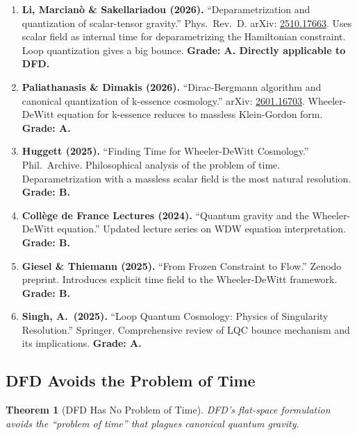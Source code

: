 \documentclass[11pt,a4paper]{article}
\newtheorem{theorem}{Theorem}
\begin{document}
\begin{enumerate}
\item \textbf{Li, Marcian\`{o} \& Sakellariadou (2026).} ``Deparametrization and quantization of scalar-tensor gravity.'' Phys.\ Rev.\ D. arXiv: \href{https://arxiv.org/abs/2510.17663}{2510.17663}. Uses scalar field as internal time for deparametrizing the Hamiltonian constraint. Loop quantization gives a big bounce. \textbf{Grade: A. Directly applicable to DFD.}

\item \textbf{Paliathanasis \& Dimakis (2026).} ``Dirac-Bergmann algorithm and canonical quantization of k-essence cosmology.'' arXiv: \href{https://arxiv.org/abs/2601.16703}{2601.16703}. Wheeler-DeWitt equation for k-essence reduces to massless Klein-Gordon form. \textbf{Grade: A.}

\item \textbf{Huggett (2025).} ``Finding Time for Wheeler-DeWitt Cosmology.'' Phil.\ Archive. Philosophical analysis of the problem of time. Deparametrization with a massless scalar field is the most natural resolution. \textbf{Grade: B.}

\item \textbf{Coll\`{e}ge de France Lectures (2024).} ``Quantum gravity and the Wheeler-DeWitt equation.'' Updated lecture series on WDW equation interpretation. \textbf{Grade: B.}

\item \textbf{Giesel \& Thiemann (2025).} ``From Frozen Constraint to Flow.'' Zenodo preprint. Introduces explicit time field to the Wheeler-DeWitt framework. \textbf{Grade: B.}

\item \textbf{Singh, A.\ (2025).} ``Loop Quantum Cosmology: Physics of Singularity Resolution.'' Springer. Comprehensive review of LQC bounce mechanism and its implications. \textbf{Grade: A.}
\end{enumerate}

\subsection{DFD Avoids the Problem of Time}

\begin{theorem}[DFD Has No Problem of Time]
\label{thm:no-problem-of-time}
DFD's flat-space formulation avoids the ``problem of time'' that plagues canonical quantum gravity.
\end{theorem}
\end{document}
